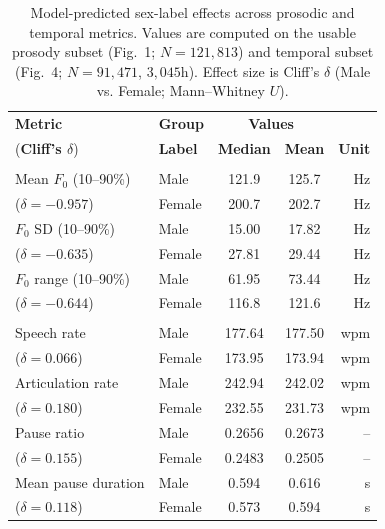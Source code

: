 \documentclass[conference]{IEEEtran}
\begin{document}
\begin{table}[t]
\centering
\caption{Model-predicted sex-label effects across prosodic and temporal metrics. Values are computed on the usable prosody subset (Fig.~1; $N{=}121{,}813$) and temporal subset (Fig.~4; $N{=}91{,}471$, $3{,}045$h). Effect size is Cliff's $\delta$ (Male vs. Female; Mann--Whitney $U$).}
\label{tab:sex_label_effects}
\small
\setlength{\tabcolsep}{3pt}
\begin{tabular}{l l c c r}
\toprule
\textbf{Metric} & \textbf{Group} & \multicolumn{2}{c}{\textbf{Values}} \\
(\textbf{Cliff's $\delta$}) & \textbf{Label} & \textbf{Median} & \textbf{Mean} & \textbf{Unit}\\
\midrule
\rowcolor{gray!20}\multicolumn{5}{c}{\textbf{Prosody (Fig.~1)}} \\
Mean $F_0$ (10--90\%)     & Male   & 121.9 & 125.7 & Hz\\
($\delta=-0.957$)         & Female & 200.7 & 202.7 & Hz\\
$F_0$ SD (10--90\%)       & Male   & 15.00 & 17.82 & Hz\\
($\delta=-0.635$)         & Female & 27.81 & 29.44 & Hz\\
$F_0$ range (10--90\%)    & Male   & 61.95 & 73.44 & Hz\\
($\delta=-0.644$)         & Female & 116.8 & 121.6 & Hz\\
\midrule
\rowcolor{gray!20}\multicolumn{5}{c}{\textbf{Temporal (Fig.~4)}} \\
Speech rate              & Male   & 177.64 & 177.50 & wpm\\
($\delta=0.066$)         & Female & 173.95 & 173.94 & wpm\\
Articulation rate        & Male   & 242.94 & 242.02 & wpm\\
($\delta=0.180$)         & Female & 232.55 & 231.73 & wpm\\
Pause ratio              & Male   & 0.2656 & 0.2673 & --\\
($\delta=0.155$)         & Female & 0.2483 & 0.2505 & --\\
Mean pause duration      & Male   & 0.594 & 0.616 & s\\
($\delta=0.118$)         & Female & 0.573 & 0.594 & s\\
\bottomrule
\end{tabular}
\end{table}
\end{document}
